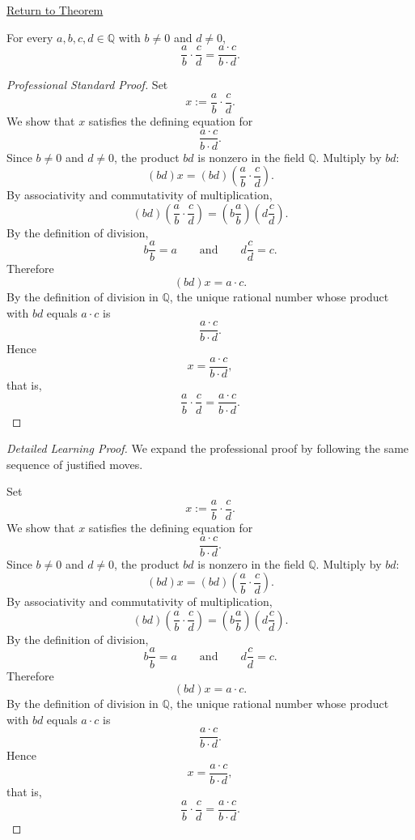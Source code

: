 \newpage
{}
\label{prf:rational-fraction-multiplication}

\begin{remark*}[Return]
\hyperref[thm:rational-fraction-multiplication]{Return to Theorem}
\end{remark*}

\begin{theorem*}
For every $a,b,c,d\in\mathbb{Q}$ with $b\neq 0$ and $d\neq 0$,
\[
\frac{a}{b}\cdot \frac{c}{d}
=
\frac{a\cdot c}{b\cdot d}.
\]
\end{theorem*}

\begin{proof}[Professional Standard Proof]
\LRAProofBodyStart
Set
\[
x:=\frac{a}{b}\cdot\frac{c}{d}.
\]
We show that $x$ satisfies the defining equation for
\[
\frac{a\cdot c}{b\cdot d}.
\]
Since $b\neq 0$ and $d\neq 0$, the product $bd$ is nonzero in the field
$\mathbb{Q}$.  Multiply by $bd$:
\[
(bd)x=(bd)\left(\frac{a}{b}\cdot\frac{c}{d}\right).
\]
By associativity and commutativity of multiplication,
\[
(bd)\left(\frac{a}{b}\cdot\frac{c}{d}\right)
=
\left(b\frac{a}{b}\right)\left(d\frac{c}{d}\right).
\]
By the definition of division,
\[
b\frac{a}{b}=a
\qquad\text{and}\qquad
d\frac{c}{d}=c.
\]
Therefore
\[
(bd)x=a\cdot c.
\]
By the definition of division in $\mathbb{Q}$, the unique rational number
whose product with $bd$ equals $a\cdot c$ is
\[
\frac{a\cdot c}{b\cdot d}.
\]
Hence
\[
x=\frac{a\cdot c}{b\cdot d},
\]
that is,
\[
\frac{a}{b}\cdot\frac{c}{d}
=
\frac{a\cdot c}{b\cdot d}.
\]
\end{proof}

\begin{proof}[Detailed Learning Proof]
\LRAProofBodyStart
We expand the professional proof by following the same sequence of justified moves.

Set
\[
x:=\frac{a}{b}\cdot\frac{c}{d}.
\]
We show that $x$ satisfies the defining equation for
\[
\frac{a\cdot c}{b\cdot d}.
\]
Since $b\neq 0$ and $d\neq 0$, the product $bd$ is nonzero in the field
$\mathbb{Q}$.  Multiply by $bd$:
\[
(bd)x=(bd)\left(\frac{a}{b}\cdot\frac{c}{d}\right).
\]
By associativity and commutativity of multiplication,
\[
(bd)\left(\frac{a}{b}\cdot\frac{c}{d}\right)
=
\left(b\frac{a}{b}\right)\left(d\frac{c}{d}\right).
\]
By the definition of division,
\[
b\frac{a}{b}=a
\qquad\text{and}\qquad
d\frac{c}{d}=c.
\]
Therefore
\[
(bd)x=a\cdot c.
\]
By the definition of division in $\mathbb{Q}$, the unique rational number
whose product with $bd$ equals $a\cdot c$ is
\[
\frac{a\cdot c}{b\cdot d}.
\]
Hence
\[
x=\frac{a\cdot c}{b\cdot d},
\]
that is,
\[
\frac{a}{b}\cdot\frac{c}{d}
=
\frac{a\cdot c}{b\cdot d}.
\]
\end{proof}

